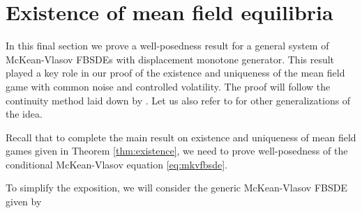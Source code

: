 \documentclass[11pt,reqno]{amsart}
\numberwithin{equation}{section}
\theoremstyle{definition}
\newcommand{\sL}{\mathcal{L}}
\begin{document}
\appendix

\section{Existence of mean field equilibria}
\label{sec:existence}
In this final section we prove a well-posedness result for a general system of McKean-Vlasov FBSDEs with displacement monotone generator.
This result played a key role in our proof of the existence and uniqueness of the mean field game with common noise and controlled volatility.
The proof will follow the continuity method laid down by \cite{pengwumonotone}.
Let us also refer to \cite{ahuja2016,cardelbook1,Zhang} for other generalizations of the idea.

Recall that to complete the main result on existence and uniqueness of mean field games given in Theorem \eqref{thm:existence}, we need to prove well-posedness of the conditional McKean-Vlasov equation \eqref{eq:mkvfbsde}.

To simplify the exposition, we will consider the generic McKean-Vlasov FBSDE given by
\end{document}
